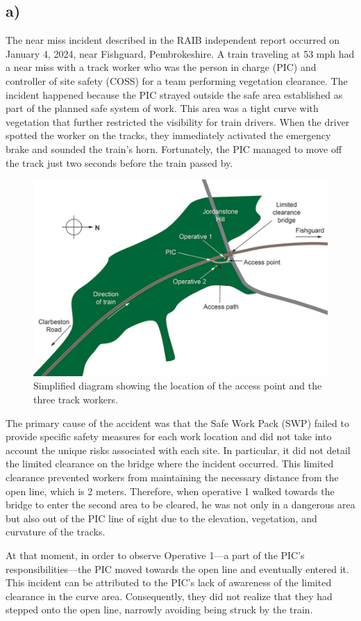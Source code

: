 \documentclass[letterpaper,12pt,leqno]{article}
\begin{document}
\subsection{a)}
The near miss incident described in the RAIB independent report occurred on January 4, 2024, near Fishguard, Pembrokeshire. A train traveling at 53 mph had a near miss with a track worker who was the person in charge (PIC) and controller of site safety (COSS) for a team performing vegetation clearance. The incident happened because the PIC strayed outside the safe area established as part of the planned safe system of work. This area was a tight curve with vegetation that further restricted the visibility for train drivers. When the driver spotted the worker on the tracks, they immediately activated the emergency brake and sounded the train's horn. Fortunately, the PIC managed to move off the track just two seconds before the train passed by.
\begin{figure}[H]
    \centering
    \includegraphics[width=0.75\linewidth]{image.png}
    \caption{Simplified diagram showing the location of the access point and the three track workers.}
    \label{fig:incident}
\end{figure}
The primary cause of the accident was that the Safe Work Pack (SWP) failed to provide specific safety measures for each work location and did not take into account the unique risks associated with each site. In particular, it did not detail the limited clearance on the bridge where the incident occurred. This limited clearance prevented workers from maintaining the necessary distance from the open line, which is 2 meters. Therefore, when operative 1 walked towards the bridge to enter the second area to be cleared, he was not only in a dangerous area but also out of the PIC line of sight due to the elevation, vegetation, and curvature of the tracks.

At that moment, in order to observe Operative 1—a part of the PIC's responsibilities—the PIC moved towards the open line and eventually entered it. This incident can be attributed to the PIC's lack of awareness of the limited clearance in the curve area. Consequently, they did not realize that they had stepped onto the open line, narrowly avoiding being struck by the train.
\end{document}
